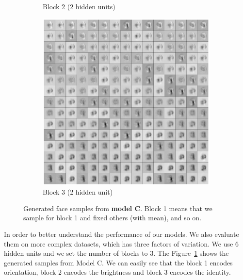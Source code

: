 \begin{figure}
\begin{subfigure}[b]{0.5\textwidth}
    \vspace{-2\baselineskip}
    \caption{Block 2 (2 hidden units)}
    \end{subfigure}
    \begin{subfigure}[b]{0.5\textwidth}
    \includegraphics[width=\textwidth]{images/norbNWblock3sample.eps}
    \vspace{-2\baselineskip}
    \caption{Block 3 (2 hidden unit)}
    \end{subfigure}
    \caption{Generated face samples from \textbf{model C}. Block 1 means that we sample for block 1 and fixed others (with mean), and so on.}\label{fig:animals}
    \label{fig:norbsamples}
\end{figure}

In order to better understand the performance of our models. We also evaluate them on more complex datasets, which has three factors of variation. We use $6$ hidden units and we set the number of blocks to $3$. The Figure~\ref{fig:norbsamples} shows the generated samples from Model C. We can easily see that the block 1 encodes orientation, block 2 encodes the brightness and block 3 encodes the identity.


